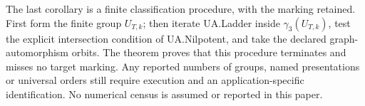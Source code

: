 The last corollary is a finite classification procedure, with the
marking retained. First form the finite group \(U_{T,k}\); then iterate
UA.Ladder inside \(\gamma_3(U_{T,k})\), test the explicit intersection
condition of UA.Nilpotent, and take the declared graph-automorphism
orbits. The theorem proves that this procedure terminates and misses no
target marking. Any reported numbers of groups, named presentations or
universal orders still require execution and an application-specific
identification. No numerical census is assumed or reported in this
paper.
